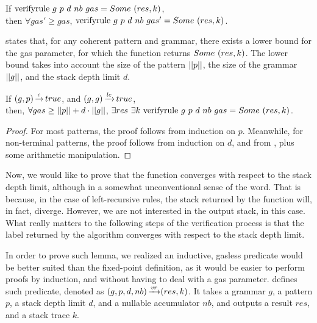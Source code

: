 \begin{lemma}%
    If $\text{verifyrule}{}\ g\ p\ d\ nb\ gas = Some\ (res, k)$, \\
    then $\forall gas' \ge gas$,
    $\text{verifyrule}{}\ g\ p\ d\ nb\ gas' = Some\ (res, k)$.
    \label{lemma:vr-gas-convergence}
\end{lemma}

 states that,
for any coherent pattern and grammar,
there exists a lower bound for the gas parameter,
for which the function returns $Some\ (res, k)$.
The lower bound
takes into account
the size of the pattern $||p||$,
the size of the grammar $||g||$,
and the stack depth limit $d$.

\begin{lemma}%
    If $(g,p) \operatorname{\xrightarrow{\mathit{c}}} true$,
    and $(g,g) \operatorname{\xrightarrow{\mathit{lc}}} true$, \\
    then, $\forall gas \ge ||p|| + d \cdot ||g||$,
    $\exists res\ \exists k\ \verifyrulecomp{g}{p}{d}{nb}{gas} = \Some (res, k)$.
    \label{lemma:vr-termination}
\end{lemma}

\begin{proof}
    For most patterns,
    the proof follows from induction on $p$.
    Meanwhile, for non-terminal patterns,
    the proof follows from induction on $d$,
    and from ,
    plus some arithmetic manipulation.
\end{proof}

Now, we would like to
prove that the function
converges with respect to the
stack depth limit,
although in a somewhat unconventional
sense of the word.
That is because,
in the case of left-recursive rules,
the stack returned by the function will,
in fact,
diverge.
However, we are not interested in
the output stack, in this case.
What really matters to the following
steps of the verification process
is that the label returned by the algorithm converges
with respect to the stack depth limit.

In order to prove such lemma,
we realized an inductive, gasless predicate
would be better suited
than the fixed-point definition,
as it would be easier to perform proofs by induction,
and without having to deal with a gas parameter.
defines such predicate,
denoted as $(g,p,d,nb) \operatorname{\xrightarrow{\mathit{vr}}} (res,k)$.
It takes a grammar $g$,
a pattern $p$,
a stack depth limit $d$,
and a nullable accumulator $nb$,
and outputs a result $res$,
and a stack trace $k$.

